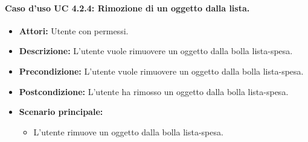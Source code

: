 \paragraph{Caso d'uso UC 4.2.4: Rimozione di un oggetto dalla lista.}
\label{Caso d'uso UC 4.2.4: Rimozione di un oggetto dalla lista.}

\FloatBarrier
\begin{itemize}
\item \textbf{Attori:} Utente con permessi.
\item \textbf{Descrizione:} L'utente vuole rimuovere un oggetto dalla bolla lista-spesa.
\item \textbf{Precondizione:} L'utente vuole rimuovere un oggetto dalla bolla lista-spesa. 
\item \textbf{Postcondizione:} L'utente ha rimosso un oggetto dalla bolla lista-spesa.
\item \textbf{Scenario principale:}
	\begin{itemize}
	\item{L'utente rimuove un oggetto dalla bolla lista-spesa.}
	\end{itemize}
\end{itemize}